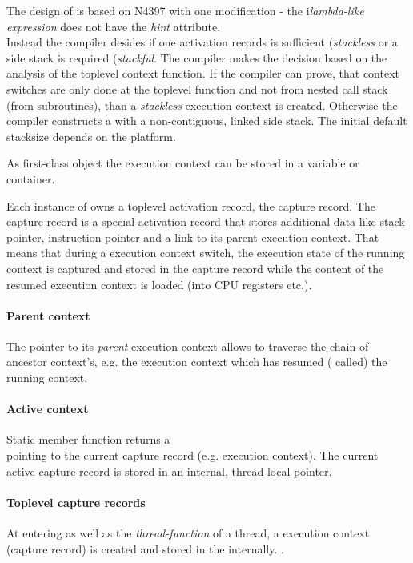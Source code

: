 The design of \ectx is based on N4397\cite{N4397} with one modification - the
i\emph{lambda-like expression} does not have the \emph{hint} attribute.\\
Instead the compiler desides if one activation records is sufficient
(\emph{stackless} or a side stack is required (\emph{stackful}. The compiler 
makes the decision based on the analysis of the toplevel context function.
If the compiler can prove, that context switches are only done at the toplevel
function and not from nested call stack (from subroutines), than a
\emph{stackless} execution context is created. Otherwise the compiler constructs
a \ectx with a non-contiguous, linked side stack. The initial default stacksize
depends on the platform.

As first-class object the execution context can be stored in a variable or
container.

Each instance of \ectx owns a toplevel activation record, the capture record.
The capture record is a special activation record that stores additional data
like stack pointer, instruction pointer and a link to its parent execution
context. That means that during a execution context switch, the execution state
of the running context is captured and stored in the capture record while the
content of the resumed execution context is loaded (into CPU registers etc.).

\paragraph*{Parent context}
The pointer to its \emph{parent} execution context allows to traverse the chain
of ancestor context's, e.g. the execution context which has resumed (\ectxop
called) the running context.

\paragraph*{Active context}
Static member function \ectxcurrent returns a\\
\ectx pointing to the current capture record (e.g. execution context). The
current active capture record is stored in an internal, thread local pointer.

\paragraph*{Toplevel capture records}
At entering \main as well as the \emph{thread-function} of a thread, a execution
context (capture record) is created and stored in the internally.
\ectxcurrent.

